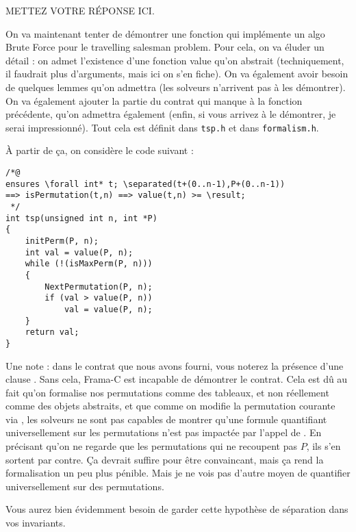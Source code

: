 \documentclass[11pt,answers]{exam}
\begin{document}
\begin{questions}
\begin{parts}
        \begin{solutionorbox}
            METTEZ VOTRE RÉPONSE ICI.
        \end{solutionorbox}

    \end{parts}


    On va maintenant tenter de démontrer une fonction qui implémente un algo Brute Force pour le travelling salesman problem.
    Pour cela, on va éluder un détail : on admet l’existence d’une fonction value qu’on abstrait (techniquement, il faudrait plus d’arguments, mais ici on s’en fiche). On va également avoir besoin de quelques lemmes qu’on admettra (les solveurs n’arrivent pas à les démontrer).
    On va également ajouter la partie du contrat qui manque à la fonction précédente, qu’on admettra également (enfin, si vous arrivez à le démontrer, je serai impressionné).
    Tout cela est définit dans \texttt{tsp.h} et dans \texttt{formalism.h}.

    À partir de ça, on considère le code suivant :

    \begin{lstlisting}
/*@
ensures \forall int* t; \separated(t+(0..n-1),P+(0..n-1))
==> isPermutation(t,n) ==> value(t,n) >= \result;
 */
int tsp(unsigned int n, int *P)
{
    initPerm(P, n);
    int val = value(P, n);
    while (!(isMaxPerm(P, n)))
    {
        NextPermutation(P, n);
        if (val > value(P, n))
            val = value(P, n);
    }
    return val;
}
    \end{lstlisting}

    Une note : dans le contrat que nous avons fourni, vous noterez la présence d’une clause \code{\\separated}. Sans cela, Frama-C est incapable de démontrer le contrat. Cela est dû au fait qu’on formalise nos permutations comme des tableaux, et non réellement comme des objets abstraits, et que comme on modifie la permutation courante via , les solveurs ne sont pas capables de montrer qu’une formule quantifiant universellement sur les permutations n’est pas impactée par l’appel de . En précisant qu’on ne regarde que les permutations qui ne recoupent pas $P$, ils s’en sortent par contre.
    Ça devrait suffire pour être convaincant, mais ça rend la formalisation un peu plus pénible. Mais je ne vois pas d’autre moyen de quantifier universellement sur des permutations.

    Vous aurez bien évidemment besoin de garder cette hypothèse de séparation dans vos invariants.


\end{questions}
\end{document}

